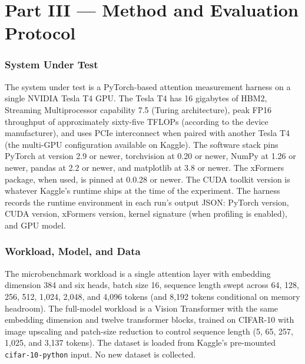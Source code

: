\documentclass[11pt]{article}
\begin{document}
\newpage

\part*{Part III --- Method and Evaluation Protocol}

\section{System Under Test}

The system under test is a PyTorch-based attention measurement harness on a single NVIDIA Tesla T4 GPU. The Tesla T4 has 16 gigabytes of HBM2, Streaming Multiprocessor capability 7.5 (Turing architecture), peak FP16 throughput of approximately sixty-five TFLOPs (according to the device manufacturer), and uses PCIe interconnect when paired with another Tesla T4 (the multi-GPU configuration available on Kaggle). The software stack pins PyTorch at version 2.9 or newer, torchvision at 0.20 or newer, NumPy at 1.26 or newer, pandas at 2.2 or newer, and matplotlib at 3.8 or newer. The xFormers package, when used, is pinned at 0.0.28 or newer. The CUDA toolkit version is whatever Kaggle's runtime ships at the time of the experiment. The harness records the runtime environment in each run's output JSON: PyTorch version, CUDA version, xFormers version, kernel signature (when profiling is enabled), and GPU model.

\section{Workload, Model, and Data}

The microbenchmark workload is a single attention layer with embedding dimension 384 and six heads, batch size 16, sequence length swept across 64, 128, 256, 512, 1{,}024, 2{,}048, and 4{,}096 tokens (and 8{,}192 tokens conditional on memory headroom). The full-model workload is a Vision Transformer with the same embedding dimension and twelve transformer blocks, trained on CIFAR-10 with image upscaling and patch-size reduction to control sequence length (5, 65, 257, 1{,}025, and 3{,}137 tokens). The dataset is loaded from Kaggle's pre-mounted \texttt{cifar-10-python} input. No new dataset is collected.
\end{document}
